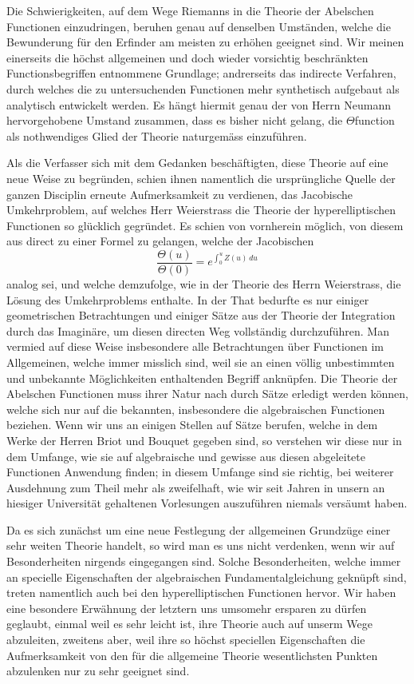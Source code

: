 \documentclass[10pt]{article}
\begin{document}
Die Schwierigkeiten, auf dem Wege Riemanns in die Theorie der Abelschen Functionen einzudringen, beruhen genau auf denselben Umständen, welche die Bewunderung für den Erfinder am meisten zu erhöhen geeignet sind. Wir meinen einerseits die höchst allgemeinen und doch wieder vorsichtig beschränkten Functionsbegriffen entnommene Grundlage; andrerseits das indirecte Verfahren, durch welches die zu untersuchenden Functionen mehr synthetisch aufgebaut als analytisch entwickelt werden. Es hängt hiermit genau der von Herrn Neumann hervorgehobene Umstand zusammen, dass es bisher nicht gelang, die $\Theta$function als nothwendiges Glied der Theorie naturgemäss einzuführen.

Als die Verfasser sich mit dem Gedanken beschäftigten, diese Theorie auf eine neue Weise zu begründen, schien ihnen namentlich die ursprüngliche Quelle der ganzen Disciplin erneute Aufmerksamkeit zu verdienen, das Jacobische Umkehrproblem, auf welches Herr Weierstrass die Theorie der hyperelliptischen Functionen so glücklich gegründet. Es schien von vornherein möglich, von diesem aus direct zu einer Formel zu gelangen, welche der Jacobischen
\[
\frac{\Theta(u)}{\Theta(0)}=e^{\int_0^u Z(u)\,du}
\]
analog sei, und welche demzufolge, wie in der Theorie des Herrn Weierstrass, die Lösung des Umkehrproblems enthalte. In der That bedurfte es nur einiger geometrischen Betrachtungen und einiger Sätze aus der Theorie der Integration durch das Imaginäre, um diesen directen Weg vollständig durchzuführen. Man vermied auf diese Weise insbesondere alle Betrachtungen über Functionen im Allgemeinen, welche immer misslich sind, weil sie an einen völlig unbestimmten und unbekannte Möglichkeiten enthaltenden Begriff anknüpfen. Die Theorie der Abelschen Functionen muss ihrer Natur nach durch Sätze erledigt werden können, welche sich nur auf die bekannten, insbesondere die algebraischen Functionen beziehen. Wenn wir uns an einigen Stellen auf Sätze berufen, welche in dem Werke der Herren Briot und Bouquet gegeben sind, so verstehen wir diese nur in dem Umfange, wie sie auf algebraische und gewisse aus diesen abgeleitete Functionen Anwendung finden; in diesem Umfange sind sie richtig, bei weiterer Ausdehnung zum Theil mehr als zweifelhaft, wie wir seit Jahren in unsern an hiesiger Universität gehaltenen Vorlesungen auszuführen niemals versäumt haben.

Da es sich zunächst um eine neue Festlegung der allgemeinen Grundzüge einer sehr weiten Theorie handelt, so wird man es uns nicht verdenken, wenn wir auf Besonderheiten nirgends eingegangen sind. Solche Besonderheiten, welche immer an specielle Eigenschaften der algebraischen Fundamentalgleichung geknüpft sind, treten namentlich auch bei den hyperelliptischen Functionen hervor. Wir haben eine besondere Erwähnung der letztern uns umsomehr ersparen zu dürfen geglaubt, einmal weil es sehr leicht ist, ihre Theorie auch auf unserm Wege abzuleiten, zweitens aber, weil ihre so höchst speciellen Eigenschaften die Aufmerksamkeit von den für die allgemeine Theorie wesentlichsten Punkten abzulenken nur zu sehr geeignet sind.
\end{document}

